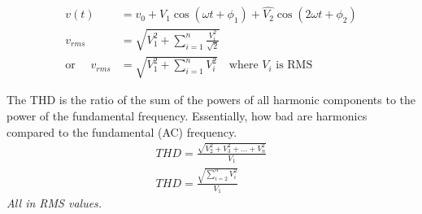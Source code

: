 \begin{example}

    \begin{align}
        v(t)                     & = v_0 + \hat{V_1}\cos{(\omega t + \phi_1)} + \hat{V_2}\cos{(2\omega t + \phi_2)} \\
        v_{rms}                  & = \sqrt{V_1^2 + \sum_{i=1}^{n}\frac{V_i^2}{\sqrt{2}}}                           \\
        \text{or } \quad v_{rms} & = \sqrt{V_1^2 + \sum_{i=1}^{n}V_i^2} \quad \text{where $V_i$ is RMS}
    \end{align}
\end{example}


\begin{definition}
    [THD]
    The THD is the ratio of the sum of the powers of all harmonic components to the power of the fundamental frequency. Essentially, how bad are harmonics compared to the fundamental (AC) frequency.
    \begin{align}
        THD = \frac{\sqrt{V_2^2 + V_3^2 + \ldots + V_n^2}}{V_1} \\
        THD = \frac{\sqrt{\sum_{i=2}^{n}V_i^2}}{V_1}
    \end{align}
    \textit{All in RMS values.}
\end{definition}